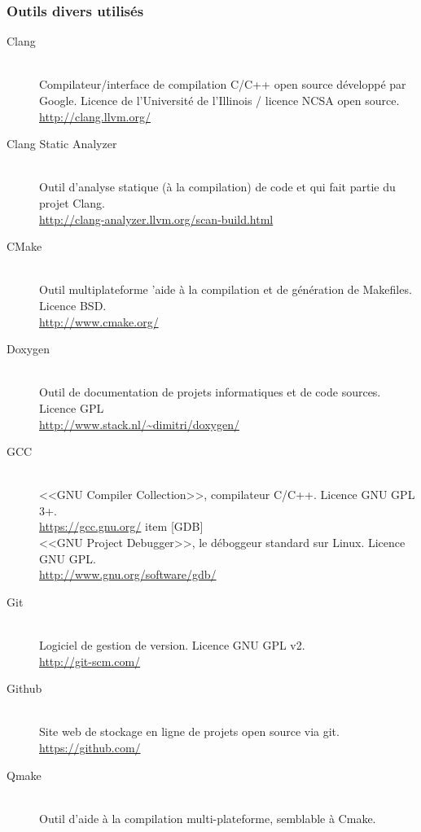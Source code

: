 \documentclass[a4paper,french,12pt]{article}
\begin{document}
		\subsubsection{Outils divers utilisés}
		  \begin{description}
		  \item [Clang]~\\
		      Compilateur/interface de compilation C/C++ open source développé par Google.
		      Licence de l'Université de l'Illinois / licence  NCSA open source.\\
		      \url{http://clang.llvm.org/}
		  \item [Clang Static Analyzer]~\\
		      Outil d'analyse statique (à la compilation) de code et qui fait partie du projet Clang. \\
		      \url{http://clang-analyzer.llvm.org/scan-build.html}
		  \item [CMake]~\\
		      Outil multiplateforme 'aide à la compilation et de génération de Makefiles.
		      Licence BSD.\\
		      \url{http://www.cmake.org/}
		  \item [Doxygen]~\\
		    Outil de documentation de projets informatiques et de code sources.
		    Licence GPL\\
		    \url{http://www.stack.nl/~dimitri/doxygen/}
		  \item [GCC]~\\
		      <<GNU Compiler Collection>>, compilateur C/C++.
		      Licence GNU GPL 3+.\\
		      \url{https://gcc.gnu.org/}
		  item [GDB]~\\
		      <<GNU Project Debugger>>, le déboggeur standard sur Linux.
		      Licence GNU GPL.\\
		      \url{http://www.gnu.org/software/gdb/}
		  \item [Git]~\\
		      Logiciel de gestion de version.
		      Licence GNU GPL v2.\\
		      \url{http://git-scm.com/}
		  \item [Github]~\\
		      Site web de stockage en ligne de projets open source via git.\\
		      \url{https://github.com/}
		  \item [Qmake]~\\
		    Outil d'aide à la compilation multi-plateforme, semblable à Cmake.

\end{description}
\end{document}
